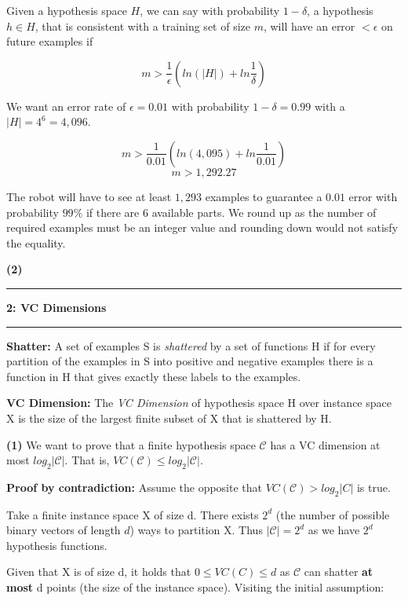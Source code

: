 \documentclass[11pt]{article}
\newcommand\question[2]{\vspace{.25in}\hrule\textbf{#1: #2}\vspace{.5em}\hrule\vspace{.10in}}
\renewcommand\part[1]{\vspace{.10in}\textbf{(#1)}}
\begin{document}
Given a hypothesis space $H$, we can say with probability $1 - \delta$, a hypothesis $h \in H$, that is consistent with a training set of size $m$, will have an error $< \epsilon$ on future examples if

$$m > \frac{1}{\epsilon}(ln(|H|) + ln\frac{1}{\delta})$$

We want an error rate of $\epsilon = 0.01$ with probability $1 - \delta = 0.99$ with a $|H| = 4^6 = 4,096$.

$$m > \frac{1}{0.01}(ln(4,095) + ln\frac{1}{0.01})$$
$$m > 1,292.27$$

The robot will have to see at least $1,293$ examples to guarantee a $0.01$ error with probability $99\%$ if there are 6 available parts. We round up as the number of required examples must be an integer value and rounding down would not satisfy the equality.

\newpage
\part{2}

\question{2}{VC Dimensions}
\textbf{Shatter:} A set of examples S is \textit{shattered} by a set of functions H if for every partition of the examples in S into positive and negative examples there is a function in H that gives exactly these labels to the examples.

\textbf{VC Dimension:} The \textit{VC Dimension} of hypothesis space H over instance space X is the size of the largest finite subset of X that is shattered by H.

\part{1} We want to prove that a finite hypothesis space $\mathcal{C}$ has a VC dimension at most $log_2|\mathcal{C}|$. That is, $VC(\mathcal{C}) \leq log_2|\mathcal{C}|$.

\textbf{Proof by contradiction:} Assume the opposite that $VC(\mathcal{C}) > log_2|C|$ is true.

Take a finite instance space X of size d. There exists $2^d$ (the number of possible binary vectors of length $d$) ways to partition X. Thus $|\mathcal{C}| = 2^d$ as we have $2^d$ hypothesis functions.

Given that X is of size d, it holds that $0 \leq VC(C) \leq d$ as $\mathcal{C}$ can shatter \textbf{at most} d points (the size of the instance space). Visiting the initial assumption:
\end{document}
